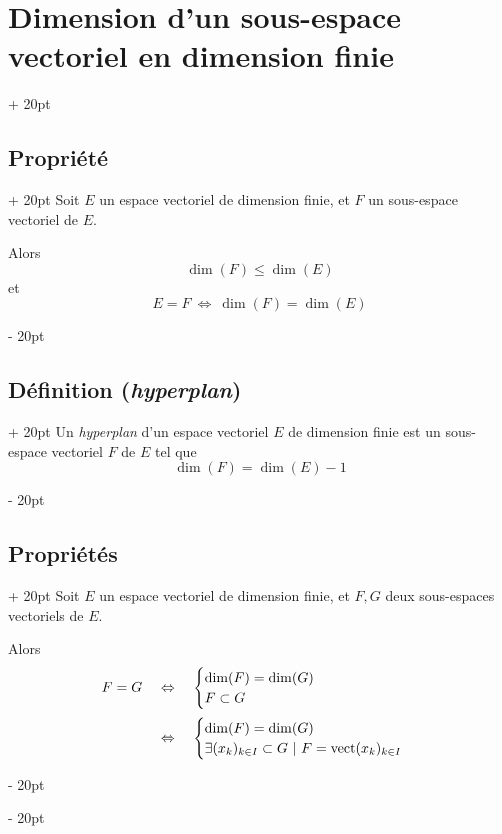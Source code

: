 \documentclass[a4paper, 12pt, twoside]{article}
\newcommand{\ssi}{\ \Leftrightarrow \ }
\newcommand{\eqsys}[2]{\begin{cases} #1 \\ #2 \end{cases}}
\renewcommand{\le}{\leqslant}
\newcommand{\ind}[1][20pt]{\advance\leftskip + #1}
\newcommand{\deind}[1][20pt]{\advance\leftskip - #1}
\newenvironment{indt}[2][20pt]{#2 \par \ind[#1]}{\par \deind} %
\begin{document}
    \begin{indt}{\section{Dimension d'un sous-espace vectoriel en dimension finie}}
        
        \begin{indt}{\subsection{Propriété}}
            Soit $E$ un espace vectoriel de dimension finie, et $F$ un sous-espace vectoriel de $E$.
            
            Alors
                \[ \dim(F) \le \dim(E) \]
            et
                \[ E = F \ssi \dim(F) = \dim(E) \]
        \end{indt}
        
        \vspace{12pt}
        
        \begin{indt}{\subsection{Définition (\textit{hyperplan})}}
            Un \textit{hyperplan} d'un espace vectoriel $E$ de dimension finie est un sous-espace vectoriel $F$ de $E$ tel que
                \[ \dim(F) = \dim(E) - 1 \]
        \end{indt}
        
        \begin{indt}{\subsection{Propriétés}}
            Soit $E$ un espace vectoriel de dimension finie, et $F, G$ deux sous-espaces vectoriels de $E$.
            
            Alors
                \[
                    \begin{array}{rcl}
                        F = G &\ssi& \eqsys{\dim(F) = \dim(G)}{F \subset G}
                        \vspace{6pt}
                        \\
                        &\ssi& \eqsys{\dim(F) = \dim(G)}{\exists (x_k)_{k \in I} \subset G\ |\ F = \mathrm{vect}(x_k)_{k \in I}}
                    \end{array}
                \]
            

\end{indt}
\end{indt}
\end{document}
